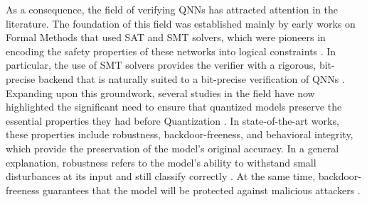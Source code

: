 {As a consequence, the field of verifying QNNs has attracted attention in the literature. The foundation of this field was established mainly by early works on Formal Methods that used SAT and SMT solvers, which were pioneers in encoding the safety properties of these networks into logical constraints \cite{pulinaAbstractionRefinementApproachVerification2010, Pulina2012Challenging}. In particular, the use of SMT solvers provides the verifier with a rigorous, bit-precise backend that is naturally suited to a bit-precise verification of QNNs \cite{baranowski2020smt}. Expanding upon this groundwork, several studies in the field have now highlighted the significant need to ensure that quantized models preserve the essential properties they had before Quantization \cite{katz2019marabou, giacobbe2020how, henriksenp.EfficientNeuralNetwork2020,song2023qnnrepair, cai2025certified, cordeiro2025neuralnetworkverificationprogramming}. In state-of-the-art works, these properties include robustness, backdoor-freeness, and behavioral integrity, which provide the preservation of the model’s original accuracy. In a general explanation, robustness refers to the model’s ability to withstand small disturbances at its input and still classify correctly \cite{sena2021verifying, huangEfficientVerificationQuantized2023, dantasComprehensiveReviewModel2024}. At the same time, backdoor-freeness guarantees that the model will be protected against malicious attackers \cite{cai2025certified}. }




